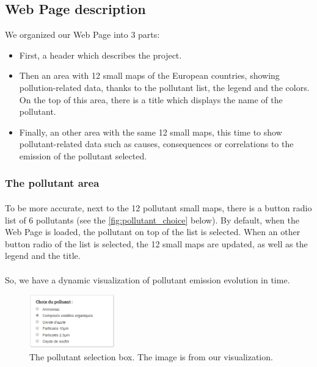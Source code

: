 \documentclass[preprint,journal]{vgtc}       %
\begin{document}
	\subsection{Web Page description}
We organized our Web Page into 3 parts:
\begin{itemize}[leftmargin=*,parsep=0cm]
\item First, a header which describes the project.
\item Then an area with 12 small maps of the European countries, showing pollution-related data, thanks to the pollutant list, the legend and the colors. On the top of this area, there is a title which displays the name of the pollutant.
\item Finally, an other area with the same 12 small maps, this time to show pollutant-related data such as causes, consequences or correlations to the emission of the pollutant selected. 
\end{itemize}

\subsubsection{The pollutant area}
\paragraph{}
To be more accurate, next to the 12 pollutant small maps, there is a button radio list of 6 pollutants (see the \autoref{fig:pollutant_choice} below). By default, when the Web Page is loaded, the pollutant on top of the list is selected. When an other button radio of the list is selected, the 12 small maps are updated, as well as the legend and the title. 
\paragraph{}
So, we have a dynamic visualization of pollutant emission evolution in time.

\begin{figure}[H]
 \centering %
 \includegraphics[width=140px]{choice1}
 \caption{The pollutant selection box. The image is from our visualization.}
 \label{fig:pollutant_choice}
\end{figure}
\end{document}
